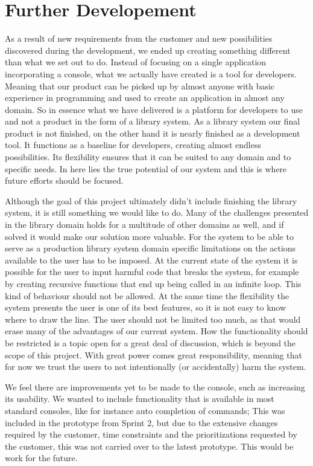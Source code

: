 \section{Further Developement}
As a result of new requirements from the customer and new possibilities discovered during the development, we ended up creating something different than what we set out to do. Instead of focusing on a single application incorporating a console, what we actually have created is a tool for developers. Meaning that our product can be picked up by almost anyone with basic experience in programming and used to create an application in almost any domain. So in essence what we have delivered is a platform for developers to use and not a product in the form of a library system. As a library system our final product is not finished, on the other hand it is nearly finished as a development tool. It functions as a baseline for developers, creating almost endless possibilities. Its flexibility ensures that it can be suited to any domain and to specific needs. In here lies the true potential of our system and this is where future efforts should be focused.

Although the goal of this project ultimately didn’t include finishing the library system, it is still something we would like to do. Many of the challenges presented in the library domain holds for a multitude of other domains as well, and if solved it would make our solution more valuable. For the system to be able to serve as a production library system domain specific limitations on the actions available to the user has to be imposed. At the current state of the system it is possible for the user to input harmful code that breaks the system, for example by creating recursive functions that end up being called in an infinite loop. This kind of behaviour should not be allowed. At the same time the flexibility the system presents the user is one of its best features, so it is not easy to know where to draw the line. The user should not be limited too much, as that would erase many of the advantages of our current system. How the functionality should be restricted is a topic open for a great deal of discussion, which is beyond the scope of this project. With great power comes great responsibility, meaning that for now we trust the users to not intentionally (or accidentally) harm the system. 

We feel there are improvements yet to be made to the console, such as increasing its usability. We wanted to include functionality that is available in most standard consoles, like for instance auto completion of commands; This was included in the prototype from Sprint 2, but due to the extensive changes required by the customer, time constraints and the prioritizations requested by the customer, this was not carried over to the latest prototype. This would be work for the future.

